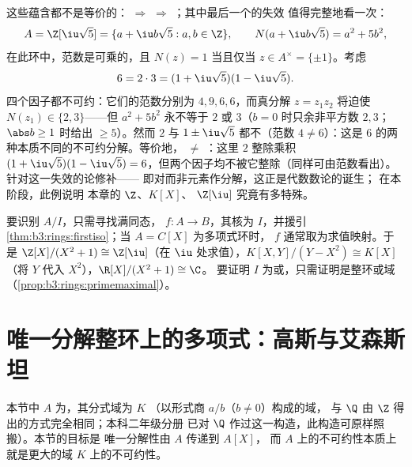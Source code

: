 \begin{example}[不具唯一分解的环]
\label{ex:b3:rings:nonufd}
这些蕴含都不是等价的： $\Rightarrow$ 
$\Rightarrow$ ；其中最后一个的失效
值得完整地看一次：
\[
A = \Z[\iu\sqrt5] = \{a + \iu b\sqrt5 : a, b \in \Z\},
\qquad N(a + \iu b\sqrt5) = a^2 + 5b^2,
\]
在此环中，范数是可乘的，且 $N(z) = 1$ 当且仅当 $z \in
A^\times = \{\pm1\}$。考虑
\[
6 = 2 \cdot 3 = (1 + \iu\sqrt5)(1 - \iu\sqrt5).
\]
四个因子都不可约：它们的范数分别为 $4, 9, 6,
6$，而真分解 $z = z_1z_2$ 将迫使
$N(z_1) \in \{2, 3\}$——但 $a^2 + 5b^2$ 永不等于 $2$
或 $3$（$b = 0$ 时只余非平方数 $2, 3$；$\abs b \geq
1$ 时给出 $\geq 5$）。然而 $2$ 与 $1 \pm
\iu\sqrt5$ 都不（范数 $4 \neq 6$）：这是
$6$ 的两种本质不同的不可约分解。等价地，
 $\neq$ ：这里 $2$ 整除乘积 $(1 +
\iu\sqrt5)(1 - \iu\sqrt5) = 6$，但两个因子均不被它整除（同样可由范数看出）。
针对这一失效的论修补——
即对\emph{}而非元素作分解，这正是代数数论的诞生；
在本阶段，此例说明
本章的 $\Z$、$K[X]$、
$\Z[\iu]$ 究竟有多特殊。
\end{example}

\begin{method}\label{met:b3:rings:quotient}
要识别 $A/I$，只需寻找满同态，
$f \colon A \to B$，其核为 $I$，并援引
\cref{thm:b3:rings:firstiso}；当 $A = C[X]$ 为多项式环时，
$f$ 通常取为求值映射。于是 $\Z[X]/(X^2+1) \cong
\Z[\iu]$（在 $\iu$ 处求值），$K[X,Y]/(Y - X^2) \cong K[X]$
（将 $Y$ 代入 $X^2$），$\R[X]/(X^2+1) \cong \C$。
要证明 $I$ 为或，只需证明是整环或域
（\cref{prop:b3:rings:primemaximal}）。
\end{method}

\section{唯一分解整环上的多项式：高斯与艾森斯坦}

本节中 $A$ 为，其分式域为 $K$
（以形式商 $a/b$（$b \neq 0$）构成的域，
与 $\Q$ 由 $\Z$ 得出的方式完全相同；本科二年级分册
已对 $\Q$ 作过这一构造，此构造可原样照搬）。本节的目标是
唯一分解性由 $A$ 传递到 $A[X]$，
而 $A$ 上的不可约性本质上就是更大的域 $K$ 上的不可约性。

